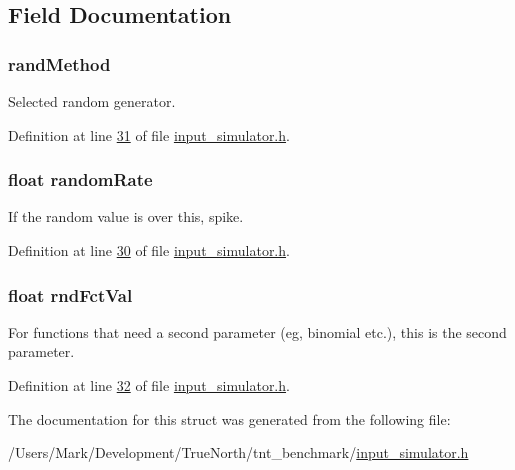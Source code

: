 \subsection{Field Documentation}
\hypertarget{structrandom_spikes_a18766f12fc4212349fb61b221f83b779}{}
\subsubsection[{rand\+Method}]{ rand\+Method}\label{structrandom_spikes_a18766f12fc4212349fb61b221f83b779}


Selected random generator. 



Definition at line \hyperlink{input__simulator_8h_source_l00031}{31} of file \hyperlink{input__simulator_8h_source}{input\+\_\+simulator.\+h}.

\hypertarget{structrandom_spikes_a1333eb5695ae83d1ffccf24b08bc6288}{}
\subsubsection[{random\+Rate}]{\setlength{\rightskip}{0pt plus 5cm}float random\+Rate}\label{structrandom_spikes_a1333eb5695ae83d1ffccf24b08bc6288}


If the random value is over this, spike. 



Definition at line \hyperlink{input__simulator_8h_source_l00030}{30} of file \hyperlink{input__simulator_8h_source}{input\+\_\+simulator.\+h}.

\hypertarget{structrandom_spikes_a0eb8199754a403ccc8eac256f9193a02}{}
\subsubsection[{rnd\+Fct\+Val}]{\setlength{\rightskip}{0pt plus 5cm}float rnd\+Fct\+Val}\label{structrandom_spikes_a0eb8199754a403ccc8eac256f9193a02}


For functions that need a second parameter (eg, binomial etc.), this is the second parameter. 



Definition at line \hyperlink{input__simulator_8h_source_l00032}{32} of file \hyperlink{input__simulator_8h_source}{input\+\_\+simulator.\+h}.



The documentation for this struct was generated from the following file\+:\begin{DoxyCompactItemize}
\item 
/\+Users/\+Mark/\+Development/\+True\+North/tnt\+\_\+benchmark/\hyperlink{input__simulator_8h}{input\+\_\+simulator.\+h}\end{DoxyCompactItemize}
